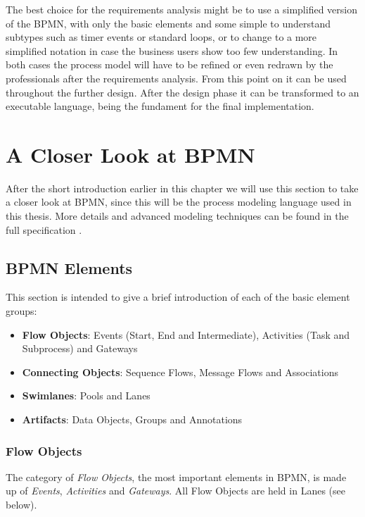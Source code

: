 The best choice for the requirements analysis might be to use a simplified version of the BPMN, with only the basic elements and some simple to understand subtypes such as timer events or standard loops, or to change to a more simplified notation in case the business users show too few understanding. In both cases the process model will have to be refined or even redrawn by the professionals after the requirements analysis. From this point on it can be used throughout the further design. After the design phase it can be transformed to an executable language, being the fundament for the final implementation.


\section{A Closer Look at BPMN}
\label{sec:bpmn}

After the short introduction earlier in this chapter we will use this section to take a closer look at BPMN, since this will be the process modeling language used in this thesis. More details and advanced modeling techniques can be found in the full specification \cite{spec_bpmn}.


\subsection{BPMN Elements}

This section is intended to give a brief introduction of each of the basic element groups:

\begin{itemize}
	\item \textbf{Flow Objects}: Events (Start, End and Intermediate), Activities (Task and Subprocess) and Gateways
	\item \textbf{Connecting Objects}: Sequence Flows, Message Flows and Associations
	\item \textbf{Swimlanes}: Pools and Lanes
	\item \textbf{Artifacts}: Data Objects, Groups and Annotations
\end{itemize}

\subsubsection*{Flow Objects}

The category of \emph{Flow Objects}, the most important elements in BPMN, is made up of \emph{Events}, \emph{Activities} and \emph{Gateways}. All Flow Objects are held in Lanes (see below).

